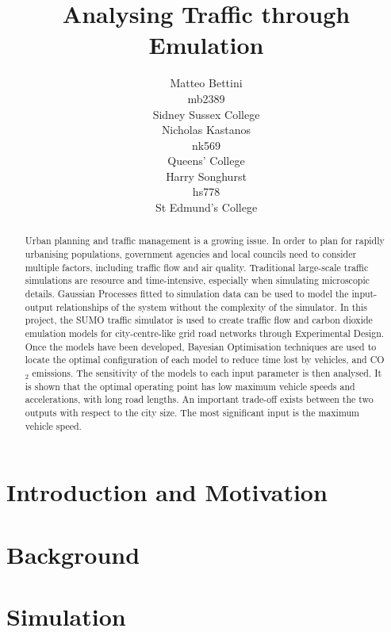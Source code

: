 \documentclass{article}
\title{Analysing Traffic through Emulation}
\author{%
  Matteo Bettini \\
  mb2389 \\
  Sidney Sussex College\\
  \And
  Nicholas Kastanos \\
  nk569 \\
  Queens' College \\
  \And
  Harry Songhurst \\
  hs778 \\
  St Edmund's College \\
}
\newcommand{\harry}[1]{\sethlcolor{green}\hl{[Harry: #1]}}
\newcommand{\harry}[1]{}
\begin{document}
\maketitle

\begin{abstract}
    Urban planning and traffic management is a growing issue. In order to plan for rapidly urbanising populations, government agencies and local councils need to consider multiple factors, including traffic flow and air quality. Traditional large-scale traffic simulations are resource and time-intensive, especially when simulating microscopic details. Gaussian Processes fitted to simulation data can be used to model the input-output relationships of the system without the complexity of the simulator. In this project, the SUMO traffic simulator is used to create traffic flow and carbon dioxide emulation models for city-centre-like grid road networks through Experimental Design. Once the models have been developed, Bayesian Optimisation techniques are used to locate the optimal configuration of each model to reduce time lost by vehicles, and CO$_2$ emissions. The sensitivity of the models to each input parameter is then analysed. It is shown that the optimal operating point has low maximum vehicle speeds and accelerations, with long road lengths. An important trade-off exists between the two outputs with respect to the city size. The most significant input is the maximum vehicle speed.
\end{abstract}



\section{Introduction and Motivation}




\section{Background}
\label{sec:background}





\section{Simulation}
\label{sec:simulation}

\end{document}
